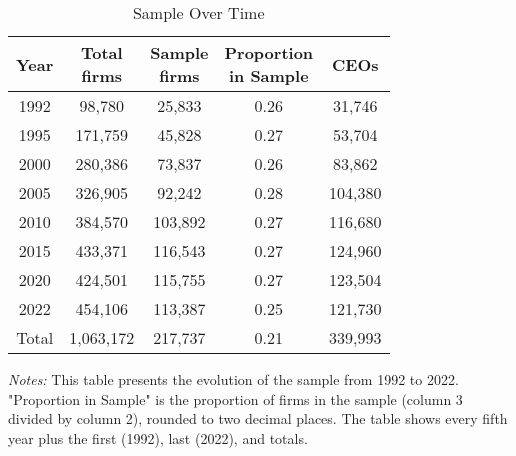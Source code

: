 \begin{table}[htbp]
\centering
\caption{Sample Over Time}
\vspace{.2cm}
\label{tab:sample}
\begin{tabular}{ccccc}
\toprule
Year & \shortstack{Total\\firms} & \shortstack{Sample\\firms} & \shortstack{Proportion\\in Sample} & CEOs \\
\midrule
1992 & 98,780 & 25,833 & 0.26 & 31,746 \\
1995 & 171,759 & 45,828 & 0.27 & 53,704 \\
2000 & 280,386 & 73,837 & 0.26 & 83,862 \\
2005 & 326,905 & 92,242 & 0.28 & 104,380 \\
2010 & 384,570 & 103,892 & 0.27 & 116,680 \\
2015 & 433,371 & 116,543 & 0.27 & 124,960 \\
2020 & 424,501 & 115,755 & 0.27 & 123,504 \\
2022 & 454,106 & 113,387 & 0.25 & 121,730 \\
\midrule
Total & 1,063,172 & 217,737 & 0.21 & 339,993 \\
\bottomrule
\end{tabular}
\begin{minipage}{9cm}
\vspace{.2cm}
\footnotesize
\textit{Notes:} This table presents the evolution of the sample from 1992 to 2022. "Proportion in Sample" is the proportion of firms in the sample (column 3 divided by column 2), rounded to two decimal places. The table shows every fifth year plus the first (1992), last (2022), and totals.
\end{minipage}
\end{table}

